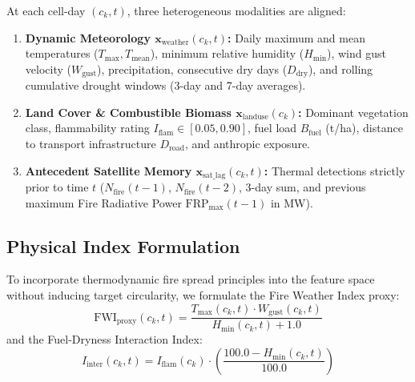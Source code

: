 \documentclass[runningheads]{llncs}
\begin{document}
At each cell-day $(c_k, t)$, three heterogeneous modalities are aligned:
\begin{enumerate}
    \item \textbf{Dynamic Meteorology $\mathbf{x}_{\text{weather}}(c_k, t)$:} Daily maximum and mean temperatures ($T_{\max}, T_{\text{mean}}$), minimum relative humidity ($H_{\min}$), wind gust velocity ($W_{\text{gust}}$), precipitation, consecutive dry days ($D_{\text{dry}}$), and rolling cumulative drought windows (3-day and 7-day averages).
    \item \textbf{Land Cover \& Combustible Biomass $\mathbf{x}_{\text{landuse}}(c_k)$:} Dominant vegetation class, flammability rating $I_{\text{flam}} \in [0.05, 0.90]$, fuel load $B_{\text{fuel}}$ (t/ha), distance to transport infrastructure $D_{\text{road}}$, and anthropic exposure.
    \item \textbf{Antecedent Satellite Memory $\mathbf{x}_{\text{sat\_lag}}(c_k, t)$:} Thermal detections strictly prior to time $t$ ($N_{\text{fire}}(t-1)$, $N_{\text{fire}}(t-2)$, 3-day sum, and previous maximum Fire Radiative Power $\text{FRP}_{\max}(t-1)$ in MW).
\end{enumerate}

\subsection{Physical Index Formulation}
To incorporate thermodynamic fire spread principles into the feature space without inducing target circularity, we formulate the Fire Weather Index proxy:
\begin{equation}
    \text{FWI}_{\text{proxy}}(c_k, t) = \frac{T_{\max}(c_k, t) \cdot W_{\text{gust}}(c_k, t)}{H_{\min}(c_k, t) + 1.0}
\end{equation}
and the Fuel-Dryness Interaction Index:
\begin{equation}
    I_{\text{inter}}(c_k, t) = I_{\text{flam}}(c_k) \cdot \left(\frac{100.0 - H_{\min}(c_k, t)}{100.0}\right)
\end{equation}
\end{document}
